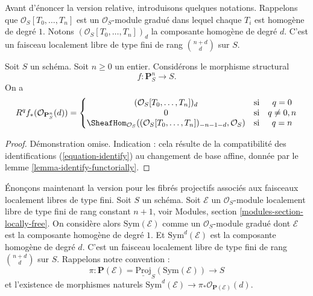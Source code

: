 \noindent
Avant d'énoncer la version relative, introduisons quelques notations.
Rappelons que $\mathcal{O}_S[T_0, \ldots, T_n]$ est un
$\mathcal{O}_S$-module gradué dans lequel chaque $T_i$ est homogène de degré $1$.
Notons $(\mathcal{O}_S[T_0, \ldots, T_n])_d$ la composante homogène de degré $d$.
C'est un faisceau localement libre de type fini de rang $\binom{n + d}{d}$ sur $S$.

\begin{lemma}
\label{lemma-cohomology-projective-space-over-base}
Soit $S$ un schéma.
Soit $n \geq 0$ un entier. Considérons
le morphisme structural
$$
f : \mathbf{P}^n_S \longrightarrow S.
$$
On a
$$
R^qf_*(\mathcal{O}_{\mathbf{P}^n_S}(d)) =
\left\{
\begin{matrix}
(\mathcal{O}_S[T_0, \ldots, T_n])_d & \text{si} & q = 0 \\
0 & \text{si} & q \not = 0, n \\
\SheafHom_{\mathcal{O}_S}(
(\mathcal{O}_S[T_0, \ldots, T_n])_{- n - 1 - d}, \mathcal{O}_S)
& \text{si} & q = n
\end{matrix}
\right.
$$
\end{lemma}

\begin{proof}
Démonstration omise. Indication : cela résulte de la compatibilité des identifications
(\ref{equation-identify}) au changement de base affine, donnée par
le lemme \ref{lemma-identify-functorially}.
\end{proof}

\noindent
Énonçons maintenant la version pour les fibrés projectifs associés aux faisceaux localement libres de
type fini. Soit $S$ un schéma. Soit $\mathcal{E}$
un $\mathcal{O}_S$-module localement libre de type fini de rang constant $n + 1$, voir
Modules, section \ref{modules-section-locally-free}.
On considère alors $\text{Sym}(\mathcal{E})$ comme un
$\mathcal{O}_S$-module gradué dont $\mathcal{E}$ est la composante homogène de degré $1$.
Et $\text{Sym}^d(\mathcal{E})$ est la composante homogène de degré $d$.
C'est un faisceau localement libre de type fini de rang $\binom{n + d}{d}$ sur $S$.
Rappelons notre convention :
$$
\pi :
\mathbf{P}(\mathcal{E})
=
\underline{\text{Proj}}_S(\text{Sym}(\mathcal{E}))
\longrightarrow
S
$$
et l'existence de morphismes naturels
$\text{Sym}^d(\mathcal{E}) \to \pi_*\mathcal{O}_{\mathbf{P}(\mathcal{E})}(d)$.

